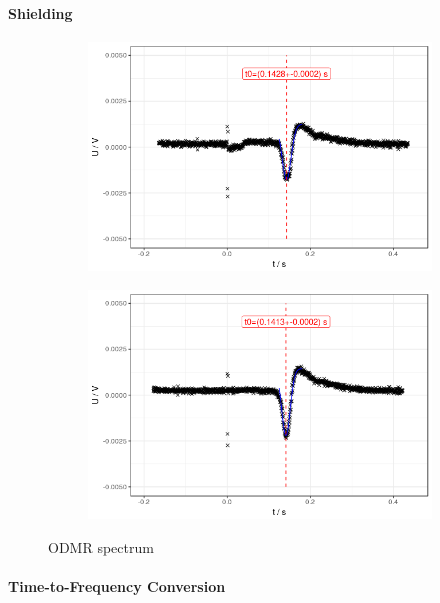 \paragraph{Shielding}
\begin{figure}
	\begin{subfigure}{0.5\textwidth}
		\includegraphics[width=\textwidth]{../figures/odmr-cal-1.png}
	\end{subfigure}
		\begin{subfigure}{0.5\textwidth}	\includegraphics[width=\textwidth]{../figures/odmr-cal-2.png}
	\end{subfigure}
	\caption{ODMR spectrum}
	\label{fig:odmr-shield}
\end{figure}
\paragraph{Time-to-Frequency Conversion}

